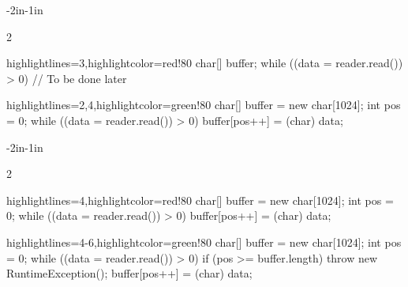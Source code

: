 \documentclass{article}
\begin{document}
\flush

\newenvironment{snippet}
  {\begin{adjustwidth}{-2in}{-1in}\setstretch{0.85}\begin{multicols}{2}\small}
  {\end{multicols}\end{adjustwidth}\flush}

\begin{snippet}
\begin{ffcode*}{highlightlines={3},highlightcolor=red!80}
char[] buffer;
while ((data = reader.read()) > 0) {
  // To be done later
}
\end{ffcode*}
\columnbreak
\begin{ffcode*}{highlightlines={2,4},highlightcolor=green!80}
char[] buffer = new char[1024];
int pos = 0;
while ((data = reader.read()) > 0) {
  buffer[pos++] = (char) data;
}
\end{ffcode*}
\end{snippet}

\newpage
{}
\begin{snippet}
\begin{ffcode*}{highlightlines={4},highlightcolor=red!80}
char[] buffer = new char[1024];
int pos = 0;
while ((data = reader.read()) > 0) {
  buffer[pos++] = (char) data;
}
\end{ffcode*}
\columnbreak
\begin{ffcode*}{highlightlines={4-6},highlightcolor=green!80}
char[] buffer = new char[1024];
int pos = 0;
while ((data = reader.read()) > 0) {
  if (pos >= buffer.length) {
    throw new RuntimeException();
  }
  buffer[pos++] = (char) data;
}
\end{ffcode*}
\end{snippet}
\end{document}
